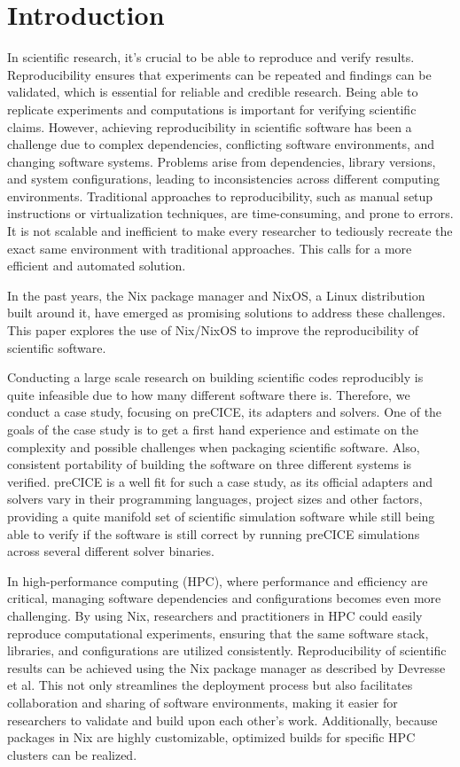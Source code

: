 \documentclass[conference,final,a4paper]{IEEEtran}
\begin{document}
\section{Introduction}

In scientific research, it's crucial to be able to reproduce and verify results.
Reproducibility ensures that experiments can be repeated and findings can be validated, which is essential for reliable and credible research.
Being able to replicate experiments and computations is important for verifying scientific claims.
However, achieving reproducibility in scientific software has been a challenge due to complex dependencies, conflicting software environments, and changing software systems.
Problems arise from dependencies, library versions, and system configurations, leading to inconsistencies across different computing environments.
Traditional approaches to reproducibility, such as manual setup instructions or virtualization techniques, are time-consuming, and prone to errors.
It is not scalable and inefficient to make every researcher to tediously recreate the exact same environment with traditional approaches.
This calls for a more efficient and automated solution.

In the past years, the Nix package manager\cite{Dolstra_2004} and NixOS\cite{Dolstra_2010}, a Linux distribution built around it, have emerged as promising solutions to address these challenges.
This paper explores the use of Nix/NixOS to improve the reproducibility of scientific software.

Conducting a large scale research on building scientific codes reproducibly is quite infeasible due to how many different software there is.
Therefore, we conduct a case study, focusing on preCICE\cite{preCICEv2}, its adapters and solvers.
One of the goals of the case study is to get a first hand experience and estimate on the complexity and possible challenges when packaging scientific software.
Also, consistent portability of building the software on three different systems is verified.
preCICE is a well fit for such a case study, as its official adapters and solvers vary in their programming languages, project sizes and other factors, providing a quite manifold set of scientific simulation software while still being able to verify if the software is still correct by running preCICE simulations across several different solver binaries.

In high-performance computing (HPC), where performance and efficiency are critical, managing software dependencies and configurations becomes even more challenging.
By using Nix, researchers and practitioners in HPC could easily reproduce computational experiments, ensuring that the same software stack, libraries, and configurations are utilized consistently.
Reproducibility of scientific results can be achieved using the Nix package manager as described by Devresse et al.\cite{Devresse_2015}
This not only streamlines the deployment process but also facilitates collaboration and sharing of software environments, making it easier for researchers to validate and build upon each other's work.
Additionally, because packages in Nix are highly customizable, optimized builds for specific HPC clusters can be realized.
\end{document}
